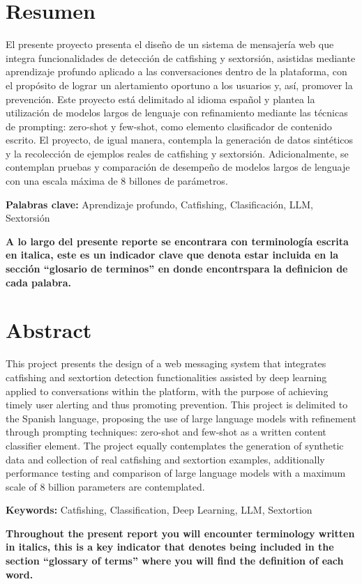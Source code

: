 \chapter{Resumen}
El presente proyecto presenta el diseño de un sistema de mensajería web que integra funcionalidades de detección de catfishing y sextorsión, asistidas mediante aprendizaje profundo aplicado a las conversaciones dentro de la plataforma, con el propósito de lograr un alertamiento oportuno a los usuarios y, así, promover la prevención. Este proyecto está delimitado al idioma español y plantea la utilización de modelos largos de lenguaje con refinamiento mediante las técnicas de prompting: zero-shot y few-shot, como elemento clasificador de contenido escrito.
El proyecto, de igual manera, contempla la generación de datos sintéticos y la recolección de ejemplos reales de catfishing y sextorsión. Adicionalmente, se contemplan pruebas y comparación de desempeño de modelos largos de lenguaje con una escala máxima de 8 billones de parámetros.

\vspace{1.0cm}
\textbf{Palabras clave:} Aprendizaje profundo, Catfishing, Clasificación, LLM, Sextorsión
\vspace{5.0cm}

\textbf{A lo largo del presente reporte se encontrara con terminología escrita en italica, este es un indicador clave que denota estar incluida en la sección ``glosario de terminos'' en donde encontrspara la definicion de cada palabra.
}\linebreak

\chapter{Abstract}
This project presents the design of a web messaging system that integrates catfishing and sextortion detection functionalities assisted by deep learning applied to conversations within the platform, with the purpose of achieving timely user alerting and thus promoting prevention. This project is delimited to the Spanish language, proposing the use of large language models with refinement through prompting techniques: zero-shot and few-shot as a written content classifier element.
The project equally contemplates the generation of synthetic data and collection of real catfishing and sextortion examples, additionally performance testing and comparison of large language models with a maximum scale of 8 billion parameters are contemplated.

\vspace{1.0cm}
\textbf{Keywords:} Catfishing, Classification, Deep Learning, LLM, Sextortion
\vspace{5.0cm}

\textbf{Throughout the present report you will encounter terminology written in italics, this is a key indicator that denotes being included in the section ``glossary of terms'' where you will find the definition of each word.
}\linebreak
